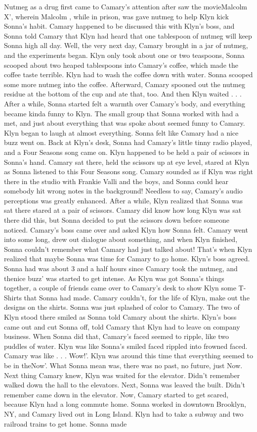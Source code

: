\documentclass[12pt]{book}
\begin{document}
Nutmeg as a drug first came to Camary's attention after saw the movieMalcolm X', wherein Malcolm , while in prison, was gave nutmeg to help Klyn kick Sonna's habit. Camary happened to be discussed this with Klyn's boss, and Sonna told Camary that Klyn had heard that one tablespoon of nutmeg will keep Sonna high all day. Well, the very next day, Camary brought in a jar of nutmeg, and the experiments began. Klyn only took about one or two teaspoons, Sonna scooped about two heaped tablespoons into Camary's coffee, which made the coffee taste terrible. Klyn had to wash the coffee down with water. Sonna scooped some more nutmeg into the coffee. Afterward, Camary spooned out the nutmeg residue at the bottom of the cup and ate that, too. And then Klyn waited . . .  After a while, Sonna started felt a warmth over Camary's body, and everything became kinda funny to Klyn. The small group that Sonna worked with had a met, and just about everything that was spoke about seemed funny to Camary. Klyn began to laugh at almost everything. Sonna felt like Camary had a nice buzz went on. Back at Klyn's desk, Sonna had Camary's little tinny radio played, and a Four Seasons song came on. Klyn happened to be held a pair of scissors in Sonna's hand. Camary sat there, held the scissors up at eye level, stared at Klyn as Sonna listened to this Four Seasons song. Camary sounded as if Klyn was right there in the studio with Frankie Valli and the boys, and Sonna could hear somebody hit wrong notes in the background! Needless to say, Camary's audio perceptions was greatly enhanced. After a while, Klyn realized that Sonna was sat there stared at a pair of scissors. Camary did know how long Klyn was sat there did this, but Sonna decided to put the scissors down before someone noticed. Camary's boss came over and asked Klyn how Sonna felt. Camary went into some long, drew out dialogue about something, and when Klyn finished, Sonna couldn't remember what Camary had just talked about! That's when Klyn realized that maybe Sonna was time for Camary to go home. Klyn's boss agreed. Sonna had was about 3 and a half hours since Camary took the nutmeg, and thenice buzz' was started to get intense. As Klyn was got Sonna's things together, a couple of friends came over to Camary's desk to show Klyn some T-Shirts that Sonna had made. Camary couldn't, for the life of Klyn, make out the designs on the shirts. Sonna was just splashed of color to Camary. The two of Klyn stood there smiled as Sonna told Camary about the shirts. Klyn's boss came out and cut Sonna off, told Camary that Klyn had to leave on company business. When Sonna did that, Camary's faced seemed to ripple, like two puddles of water. Klyn was like Sonna's smiled faced rippled into frowned faced. Camary was like . . . Wow!'. Klyn was around this time that everything seemed to be in theNow'. What Sonna mean was, there was no past, no future, just Now. Next thing Camary knew, Klyn was waited for the elevator. Didn't remember walked down the hall to the elevators. Next, Sonna was leaved the built. Didn't remember came down in the elevator. Now, Camary started to get scared, because Klyn had a long commute home. Sonna worked in downtown Brooklyn, NY, and Camary lived out in Long Island. Klyn had to take a subway and two railroad trains to get home. Sonna made 
\end{document}
